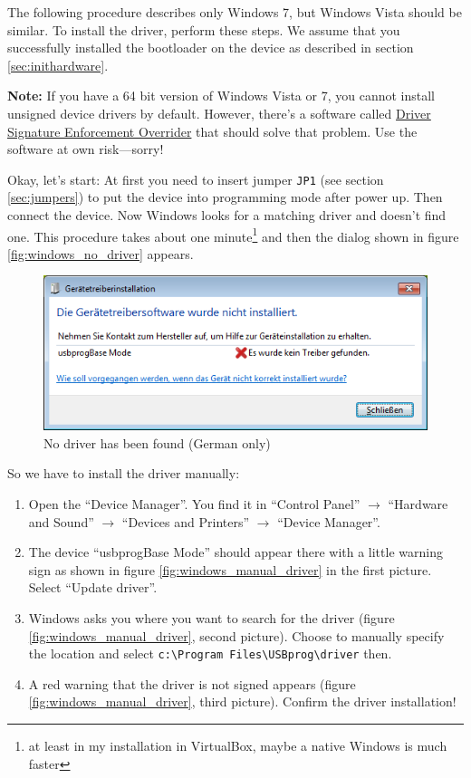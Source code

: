 \documentclass[bibtotoc,UKenglish,halfparskip,oneside,DIV12]{scrreprt}
\begin{document}
The following procedure describes only Windows 7, but Windows Vista should be similar.  To install
the driver, perform these steps. We assume that you successfully installed the bootloader on the
device as described in section \vref{sec:inithardware}.

\textbf{Note:} If you have a 64 bit version of Windows Vista or 7, you cannot install unsigned
device drivers by default. However, there's a software called
\href{http://www.ngohq.com/home.php?page=dseo}{Driver Signature Enforcement
Overrider} that should solve that problem. Use the software at own risk---sorry!

Okay, let's start: At first you need to insert jumper \texttt{JP1} (see section \vref{sec:jumpers})
to put the device into programming mode after power up. Then connect the device. Now Windows looks
for a matching driver and doesn't find one. This procedure takes about one minute\footnote{at least
in my installation in VirtualBox, maybe a native Windows is much faster} and then the dialog shown
in figure \vref{fig:windows_no_driver} appears.

\begin{figure}[ht]
  \centering
  \includegraphics[scale=.7]{images/win7_1.png}
  \caption{No driver has been found (German only)}
  \label{fig:windows_no_driver}
\end{figure}

So we have to install the driver manually:

\begin{enumerate}
  \item Open the ``Device Manager''. You find it in ``Control Panel'' $\rightarrow$ ``Hardware and
    Sound'' $\rightarrow$ ``Devices and Printers'' $\rightarrow$ ``Device Manager''.

  \item The device ``usbprogBase Mode'' should appear there with a little warning sign as shown in
    figure \vref{fig:windows_manual_driver} in the first picture. Select ``Update driver''. 

  \item Windows asks you where you want to search for the driver (figure
    \vref{fig:windows_manual_driver}, second picture). Choose to manually specify the location
    and select \texttt{c:\textbackslash{}Program Files\textbackslash{}USBprog\textbackslash{}driver}
    then.

  \item A red warning that the driver is not signed appears (figure
    \vref{fig:windows_manual_driver}, third picture). Confirm the driver installation!
\end{enumerate}
\end{document}

